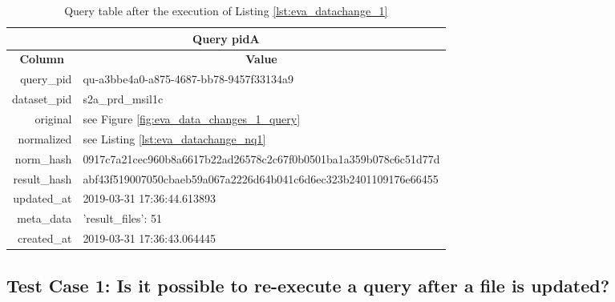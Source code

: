 \documentclass[draft,final]{vutinfth} %
\begin{document}
\begin{enumerate}
	\begin{table}[]
		\caption{Query table after the execution of Listing \ref{lst:eva_datachange_1}}
		\centering
		\begin{tabular}{|r|l|}
			\hline \multicolumn{2}{|c|}{\textbf{Query pidA}} \\
			\hline \multicolumn{1}{|c|}{\textbf{Column}}  &  \multicolumn{1}{c|}{\textbf{Value}} \\ \hline
			query\_pid & qu-a3bbe4a0-a875-4687-bb78-9457f33134a9  \\ 
			dataset\_pid & s2a\_prd\_msil1c  \\ 
			original & see Figure \ref{fig:eva_data_changes_1_query}   \\
			normalized & see Listing \ref{lst:eva_datachange_nq1}  \\
			norm\_hash & 0917c7a21cec960b8a6617b22ad26578c2c67f0b0501ba1a359b078c6c51d77d  \\
			result\_hash & abf43f519007050cbaeb59a067a2226d64b041c6d6ec323b2401109176e66455   \\
			updated\_at & 2019-03-31 17:36:44.613893   \\
			meta\_data & {'result\_files': 51}  \\
			created\_at & 2019-03-31 17:36:43.064445   \\ \hline
		\end{tabular}
		\label{Tab:eva_datachanges1}
	\end{table}
\end{enumerate}

\subsection*{Test Case 1: Is it possible to re-execute a query after a file is updated?}	\label{Tab:eva_datachanges_tc1}
\end{document}
